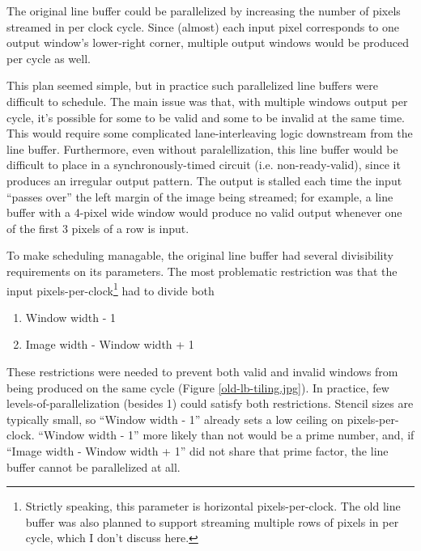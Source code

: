 \documentclass[12pt]{article}
\begin{document}
The original line buffer could be parallelized by increasing the
number of pixels streamed in per clock cycle. Since (almost) each
input pixel corresponds to one output window's lower-right corner,
multiple output windows would be produced per cycle as well.

This plan seemed simple, but in practice such parallelized line
buffers were difficult to schedule. The main issue was that, with
multiple windows output per cycle, it's possible for some to be valid
and some to be invalid at the same time. This would require some
complicated lane-interleaving logic downstream from the line
buffer. Furthermore, even without paralellization, this line buffer
would be difficult to place in a synchronously-timed circuit
(i.e. non-ready-valid), since it produces an irregular output
pattern. The output is stalled each time the input ``passes over'' the
left margin of the image being streamed; for example, a line buffer
with a 4-pixel wide window would produce no valid output whenever
one of the first 3 pixels of a row is input.

To make scheduling managable, the original line buffer had several
divisibility requirements on its parameters. The most problematic
restriction was that the input pixels-per-clock\footnote{
  Strictly speaking, this parameter is horizontal pixels-per-clock.
  The old line buffer was also planned to support streaming multiple
  rows of pixels in per cycle, which I don't discuss here.
} had to divide both

\begin{enumerate}
\item Window width - 1
\item Image width - Window width + 1
\end{enumerate}

These restrictions were needed to prevent both valid and invalid
windows from being produced on the same cycle (Figure
\ref{old-lb-tiling.jpg}). In practice, few levels-of-parallelization
(besides 1) could satisfy both restrictions. Stencil sizes are
typically small, so ``Window width - 1'' already sets a low ceiling on
pixels-per-clock. ``Window width - 1'' more likely than not would be a
prime number, and, if ``Image width - Window width + 1'' did not share
that prime factor, the line buffer cannot be parallelized at all.
\end{document}
